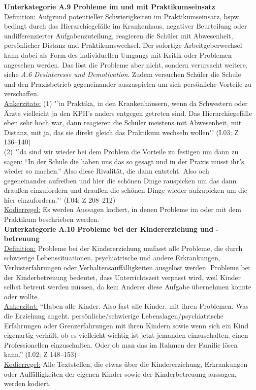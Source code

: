 \noindent
\textbf{Unterkategorie A.9 Probleme im und mit Praktikumseinsatz}\\
\underline{Definition:} Aufgrund potentieller Schwierigkeiten im Praktikumseinsatz, bspw. bedingt durch das Hierarchiegefälle im Krankenhaus, negativer Beurteilung oder undifferenzierter Aufgabenzuteilung, reagieren die Schüler mit Abwesenheit, persönlicher Distanz und Praktikumswechsel. Der sofortige Arbeitgeberwechsel kann dabei als Form des individuellen Umgangs mit Kritik oder Problemen angesehen werden. Das löst die Probleme aber nicht, sondern verursacht weitere, siehe \textit{A.6 Desinteresse und Demotivation}. Zudem versuchen Schüler die Schule und den Praxisbetrieb gegeneinander auszuspielen um sich persönliche Vorteile zu verschaffen.\\
\underline{Ankerzitate:} (1) "'in Praktika, in den Krankenhäusern, wenn da Schwestern oder Ärzte vielleicht ja den KPH's anders entgegen getreten sind. Das Hierarchiegefälle eben sehr hoch war, dann reagieren die Schüler meistens mit Abwesenheit, mit Distanz, mit ja, das sie direkt gleich das Praktikum wechseln wollen"' (I.03; Z 136--140)\\ (2) "'da sind wir wieder bei dem Problem die Vorteile zu festigen um dann zu sagen: "`In der Schule die haben uns das so gesagt und in der Praxis müsst ihr's wieder so machen."' Also diese Rivalität, die dann entsteht. Also och gegeneinander aufreiben und hier die schönen Dinge rauspicken um das dann draußen einzufordern und draußen die schönen Dinge wieder aufzupicken um die hier einzufordern."' (I.04; Z 208--212)\\
\underline{Kodierregel:} Es werden Aussagen kodiert, in denen Probleme im oder mit dem Praktikum beschrieben werden.\\

\noindent
\textbf{Unterkategorie A.10 Probleme bei der Kindererziehung und -betreuung}\\
\underline{Definition:} Probleme bei der Kindererziehung umfasst alle Probleme, die durch schwierige Lebenssituationen, psychiatrische und andere Erkrankungen, Verlusterfahrungen oder Verhaltensauffälligkeiten ausgelöst werden. Probleme bei der Kinderbetreuung bedeutet, dass Unterrichtszeit verpasst wird, weil Kinder selbst betreut werden müssen, da kein Anderer diese Aufgabe übernehmen konnte oder wollte. \\
\underline{Ankerzitat:} "`Haben alle Kinder. Also fast alle Kinder. mit ihren Problemen. Was die Erziehung angeht. persönliche/schwierige Lebenslagen/psychiatrische Erfahrungen oder Grenzerfahrungen mit ihren Kindern sowie wenn sich ein Kind eigenartig verhält, ob es vielleicht wichtig ist jetzt jemanden einzuschalten, einen Professionellen einzuschalten. Oder ob man das im Rahmen der Familie lösen kann."' (I.02; Z 148--153)\\
\underline{Kodierregel:} Alle Textstellen, die etwas über die Kindererziehung, Erkrankungen oder Auffälligkeiten der eigenen Kinder sowie der Kinderbetreuung aussagen, werden kodiert.\\

